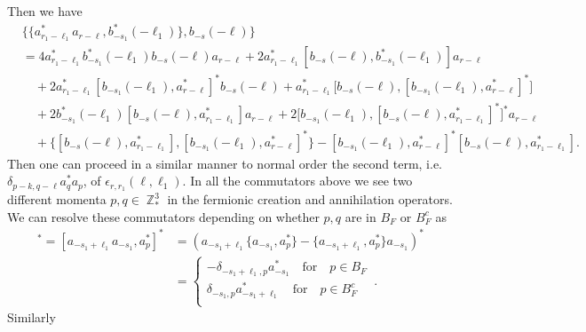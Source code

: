 \documentclass[sn-mathphys, Numbered ,a4paper]{sn-jnl}%
\DeclareMathOperator{\Z}{\mathbb{Z}}
\theoremstyle{plain}
\theoremstyle{definition}
\theoremstyle{remark}
\theoremstyle{plain}
\theoremstyle{definition}
\theoremstyle{remark}
\begin{document}
Then we have
\begin{align}
    &\big\{\{a^*_{r_1-\ell_1}a_{r-\ell}, b^*_{-s_1}(-\ell_1)\},b_{-s}(-\ell)\big\}\nonumber\\
    &= 4a^*_{  r_1-\ell_1}b^*_{-s_1}(-\ell_1)b_{-s}(-\ell)a_{ r-\ell} + 2a^*_{  r_1-\ell_1}[b_{-s}(-\ell),b^*_{-s_1}(-\ell_1)]a_{ r-\ell}\nonumber\\ 
    &\quad + 2a^*_{r_1-\ell_1}[b_{-s_1}(-\ell_1),a^*_{ r-\ell}]^*b_{-s}(-\ell) + a^*_{  r_1-\ell_1}\big[b_{-s}(-\ell),[b_{-s_1}(-\ell_1),a^*_{ r-\ell}]^*\big]\nonumber\\
    &\quad + 2b^*_{-s_1}(-\ell_1)[b_{-s}(-\ell),a^*_{  r_1-\ell_1}]a_{ r-\ell} +2\big[b_{-s_1}(-\ell_1),[b_{-s}(-\ell),a^*_{  r_1-\ell_1}]^*\big]^*a_{ r-\ell}\nonumber\\
    &\quad + \big\{ [b_{-s}(-\ell),a^*_{  r_1-\ell_1}],[b_{-s_1}(-\ell_1), a^*_{ r-\ell}]^* \big\} - [ b_{-s_1}(-\ell_1), a^*_{ r-\ell}]^* [b_{-s}(-\ell), a^*_{r_1-\ell_1}].\label{eq:no2comm}
\end{align}
Then one can proceed in a similar manner to normal order the second term, i.e. $\delta_{p-k,q-\ell}a^*_{q}a_{p}$, of $\epsilon_{r,r_1}(\ell, \ell_1)$. In all the commutators above we see two different momenta $p,q \in \Z^3_*$ in the fermionic creation and annihilation operators. We can resolve these commutators depending on whether $p,q$ are in $B_{F}$ or $B_{F}^c$ as 
\begin{align}
	[b_{-s_1}(-\ell_1), a^*_{p}]^* = [a_{-s_1+\ell_1}a_{-s_1}, a^*_{p}]^* &=\left(a_{-s_1+\ell_1}\{a_{-s_1}, a^*_{p}\}-\{a_{-s_1+\ell_1}, a^*_{p}\}a_{-s_1} \right)^*\\ 
	&=\begin{cases}
		-\delta_{-s_1+\ell_1,p}a^*_{-s_1} \quad\text{for}\quad p \in B_F\\
		\delta_{-s_1,p}a^*_{-s_1+\ell_1} \quad\text{for}\quad p \in B^c_F\\
	\end{cases}\,.
\end{align}
Similarly
\end{document}
